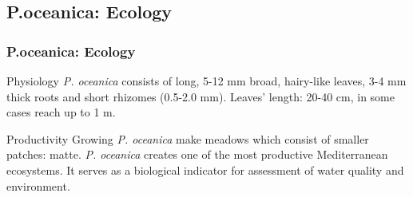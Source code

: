 \documentclass[pdflatex,compress,9pt,
	xcolor={dvipsnames,dvipsnames,svgnames,x11names,table},
	hyperref={colorlinks = true,breaklinks = true, urlcolor = NavyBlue, breaklinks = true}]{beamer}
\begin{document}
\subsection{P.oceanica: Ecology}
\begin{frame}\frametitle{P.oceanica: Ecology}
\begin{figure}[H]
	\centering
			\hspace{1mm}
			\hspace{1mm}

\end{figure}
\footnotesize{
\begin{alertblock}{Physiology}
\emph{P. oceanica} consists of long, 5-12 mm broad, hairy-like leaves, 3-4 mm thick roots and short rhizomes (0.5-2.0 mm). Leaves' length: 20-40 cm, in some cases reach up to 1 m.
\end{alertblock}

\begin{block}{Productivity}
Growing \emph{P. oceanica} make meadows which consist of smaller patches: matte. \emph{P. oceanica} creates one of the most productive Mediterranean ecosystems. It serves as a biological indicator for assessment of water quality and environment.
\end{block}}

\end{frame}
\end{document}
